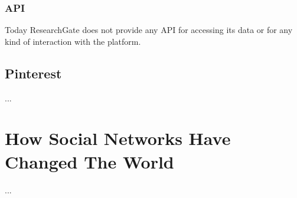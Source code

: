 \subsubsection*{API}
Today ResearchGate does not provide any API for accessing its data or for any kind of interaction with the platform.

\subsection{Pinterest}
...


\section{How Social Networks Have Changed The World}
...
